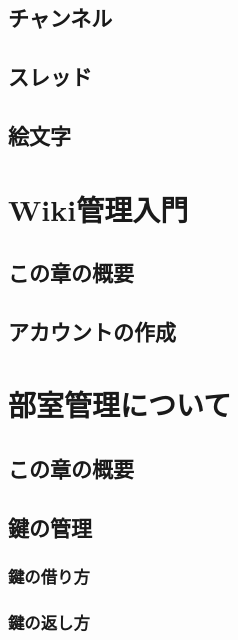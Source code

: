\documentclass[lualatex,ja=standard,12pt,a4j]{bxjsbook}
\begin{document}
		\section{チャンネル}
		\section{スレッド}
		\section{絵文字}
	\chapter{Wiki管理入門}
		\section{この章の概要}
		\section{アカウントの作成}
	\chapter{部室管理について}
		\section{この章の概要}
		\section{鍵の管理}
		\subsection{鍵の借り方}
		\subsection{鍵の返し方}
\end{document}
